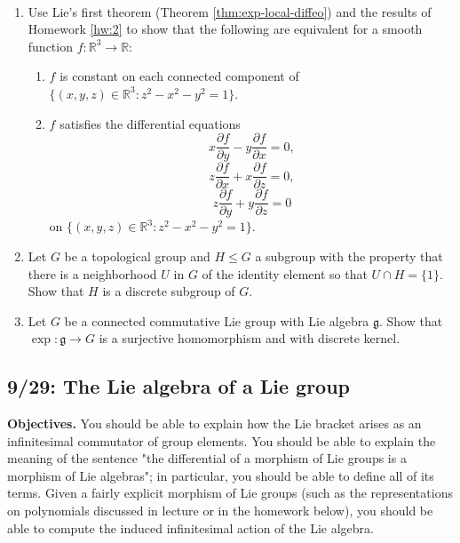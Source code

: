 \documentclass[reqno]{amsart} 
\begin{document}
\begin{homework}~\label{hw:3-lie-first}
  \begin{enumerate}
  \item Use Lie's first theorem (Theorem \ref{thm:exp-local-diffeo}) and the results of Homework \ref{hw:2} to show that the following are equivalent for a smooth function $f : \mathbb{R}^3 \rightarrow \mathbb{R}$:
    \begin{enumerate}
    \item $f$ is constant on each connected component of $\{(x,y,z) \in \mathbb{R}^3 : z^2 - x^2 - y^2 = 1\}$.
    \item $f$ satisfies the differential equations
      \begin{equation*}
        x \frac{\partial f }{\partial y } - y \frac{\partial f}{ \partial x} = 0,
      \end{equation*}
      \begin{equation*}
        z \frac{\partial f }{\partial x } + x \frac{\partial f}{ \partial z} = 0,
      \end{equation*}
      \begin{equation*}
        z \frac{\partial f }{\partial y } + y \frac{\partial f}{ \partial z} = 0
      \end{equation*}
      on $\{(x,y,z) \in \mathbb{R}^3 : z^2 - x^2 - y^2 = 1\}$.
    \end{enumerate}
  \item Let $G$ be a topological group and $H \leq G$ a subgroup with the property that there is a neighborhood $U$ in $G$ of the identity element so that $U \cap H = \{1\}$.  Show that $H$ is a discrete subgroup of $G$.
  \item Let $G$ be a connected commutative Lie group with Lie algebra $\mathfrak{g}$.  Show that $\exp : \mathfrak{g} \rightarrow G$ is a surjective homomorphism and with discrete kernel.
  \end{enumerate}
\end{homework}

\newpage
\subsection{9/29: The Lie algebra of a Lie group}
\label{sec:org102c8ed}
\textbf{Objectives.} You should be able to explain how the Lie bracket arises as an infinitesimal commutator of group elements.  You should be able to explain the meaning of the sentence "the differential of a morphism of Lie groups is a morphism of Lie algebras"; in particular, you should be able to define all of its terms.  Given a fairly explicit morphism of Lie groups (such as the representations on polynomials discussed in lecture or in the homework below), you should be able to compute the induced infinitesimal action of the Lie algebra.
\end{document}
